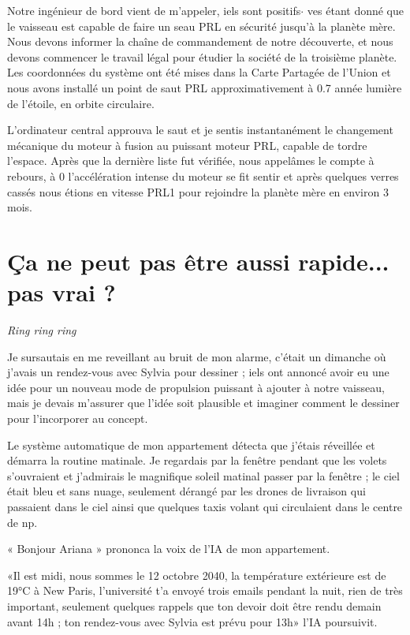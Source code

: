 \documentclass[12pt,hidelinks,a4paper]{book}
\begin{document}
Notre ingénieur de bord vient de m'appeler, iels sont positifs$\cdot$ ves
étant donné que le vaisseau est capable de faire un seau PRL en sécurité
jusqu'à la planète mère. Nous devons informer la chaîne de commandement
de notre découverte, et nous devons commencer le travail légal pour
étudier la société de la troisième planète. Les coordonnées du système
ont été mises dans la Carte Partagée de l'Union et nous avons installé
un point de saut PRL approximativement à 0.7 année lumière de l'étoile,
en orbite circulaire.\par

\bigskip

L'ordinateur central approuva le saut et je sentis instantanément
le changement mécanique du moteur à fusion au puissant moteur PRL,
capable de tordre l'espace. Après que la dernière liste fut vérifiée,
nous appelâmes le compte à rebours, à 0 l'accélération intense du
moteur se fit sentir et après quelques verres cassés nous étions en
vitesse PRL1 pour rejoindre la planète mère en environ 3 mois.\par
\bigskip

\chapter{Ça ne peut pas être aussi rapide... pas vrai ?}

\textit{Ring ring ring}

Je sursautais en me reveillant au bruit de mon alarme, c'était un
dimanche où j'avais un rendez-vous avec Sylvia pour dessiner ; iels
ont annoncé avoir eu une idée pour un nouveau mode de propulsion puissant
à ajouter à notre vaisseau, mais je devais m'assurer que l'idée soit
plausible et imaginer comment le dessiner pour l'incorporer au concept.\par

\bigskip
Le système automatique de mon appartement détecta que j'étais réveillée
et démarra la routine matinale. Je regardais par la fenêtre pendant
que les volets s'ouvraient et j'admirais le magnifique soleil matinal
passer par la fenêtre ; le ciel était bleu et sans nuage, seulement
dérangé par les drones de livraison qui passaient dans le ciel ainsi
que quelques taxis volant qui circulaient dans le centre de \gls{np}. \par

\bigskip
« Bonjour Ariana » prononca la voix de l'IA de mon appartement.\par

\bigskip
«Il est midi, nous sommes le 12 octobre 2040, la température extérieure
est de 19°C à New Paris, l'université t'a envoyé trois emails pendant
la nuit, rien de très important, seulement quelques rappels que ton
devoir doit être rendu demain avant 14h ; ton rendez-vous avec Sylvia
est prévu pour 13h» l'IA poursuivit.\par
\end{document}
